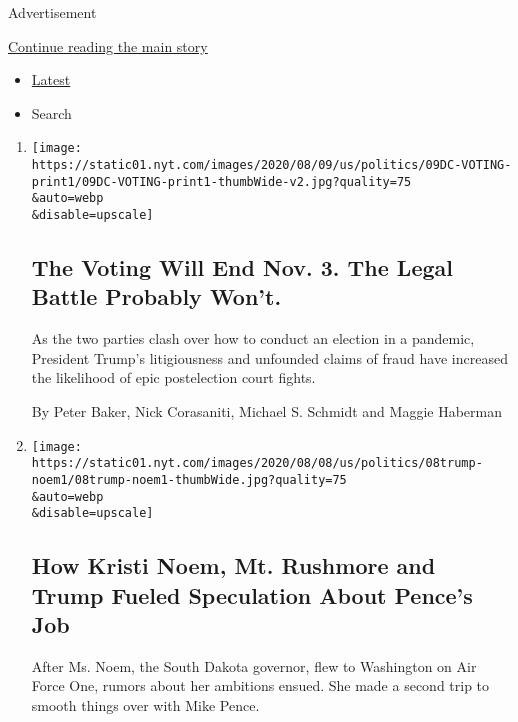 Advertisement

\protect\hyperlink{after-mid1}{Continue reading the main story}

\begin{itemize}
\tightlist
\item
  \protect\hyperlink{stream-panel}{Latest}
\item
  Search
\end{itemize}

\begin{enumerate}
\def\labelenumi{\arabic{enumi}.}
\item
  \href{/2020/08/08/us/politics/voting-nov-3-election.html}{}

  \texttt{[image: https://static01.nyt.com/images/2020/08/09/us/politics/09DC-VOTING-print1/09DC-VOTING-print1-thumbWide-v2.jpg?quality=75\\\&auto=webp\\\&disable=upscale]}

  \hypertarget{the-voting-will-end-nov-3-the-legal-battle-probably-wont-1}{%
  \subsection{The Voting Will End Nov. 3. The Legal Battle Probably
  Won't.}\label{the-voting-will-end-nov-3-the-legal-battle-probably-wont-1}}

  As the two parties clash over how to conduct an election in a
  pandemic, President Trump's litigiousness and unfounded claims of
  fraud have increased the likelihood of epic postelection court fights.

  By Peter Baker, Nick Corasaniti, Michael S. Schmidt and Maggie
  Haberman
\item
  \href{/2020/08/08/us/politics/kristi-noem-pence-trump.html}{}

  \texttt{[image: https://static01.nyt.com/images/2020/08/08/us/politics/08trump-noem1/08trump-noem1-thumbWide.jpg?quality=75\\\&auto=webp\\\&disable=upscale]}

  \hypertarget{how-kristi-noem-mt-rushmore-and-trump-fueled-speculation-about-pences-job}{%
  \subsection{How Kristi Noem, Mt. Rushmore and Trump Fueled Speculation
  About Pence's
  Job}\label{how-kristi-noem-mt-rushmore-and-trump-fueled-speculation-about-pences-job}}

  After Ms. Noem, the South Dakota governor, flew to Washington on Air
  Force One, rumors about her ambitions ensued. She made a second trip
  to smooth things over with Mike Pence.


\end{enumerate}
